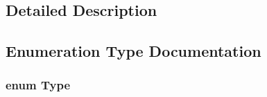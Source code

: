 \subsection{Detailed Description}


\subsection{Enumeration Type Documentation}
\hypertarget{group___i_n_f2990-04_ga1d1cfd8ffb84e947f82999c682b666a7}{
\subsubsection[{Type}]{\setlength{\rightskip}{0pt plus 5cm}enum {\bf Type}}}\label{group___i_n_f2990-04_ga1d1cfd8ffb84e947f82999c682b666a7}
